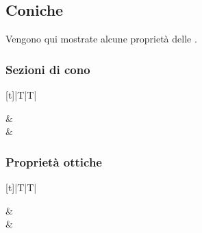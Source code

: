 \documentclass[letterpaper,10pt,italian]{jupyterBook}
\begin{document}
\subsection{Coniche}
\label{\detokenize{ch/analytic_geometry/analytic_geometry_2d/notes:coniche}}\label{\detokenize{ch/analytic_geometry/analytic_geometry_2d/notes:geometry-analytic-2d-notes-conics}}
\sphinxAtStartPar
Vengono qui mostrate alcune proprietà delle {\hyperref[\detokenize{ch/analytic_geometry/analytic_geometry_2d/conics:geometry-analytic-2d-conics}]{}}.


\subsubsection{Sezioni di cono}
\label{\detokenize{ch/analytic_geometry/analytic_geometry_2d/notes:sezioni-di-cono}}\label{\detokenize{ch/analytic_geometry/analytic_geometry_2d/notes:geometry-analytic-2d-notes-conics-cone}}

\begin{savenotes}\sphinxattablestart
\centering
\begin{tabulary}{\linewidth}[t]{|T|T|}
\hline

\sphinxAtStartPar
{}
&
\sphinxAtStartPar
{}
\\
\hline
\sphinxAtStartPar
{}
&
\sphinxAtStartPar
{}
\\
\hline
\end{tabulary}
\par
\sphinxattableend\end{savenotes}


\subsubsection{Proprietà ottiche}
\label{\detokenize{ch/analytic_geometry/analytic_geometry_2d/notes:proprieta-ottiche}}\label{\detokenize{ch/analytic_geometry/analytic_geometry_2d/notes:geometry-analytic-2d-notes-conics-optics}}

\begin{savenotes}\sphinxattablestart
\centering
\begin{tabulary}{\linewidth}[t]{|T|T|}
\hline

\sphinxAtStartPar
{}
&
\sphinxAtStartPar
{}
\\
\hline
\sphinxAtStartPar
{}
&
\sphinxAtStartPar
{}
\\
\hline
\end{tabulary}
\par
\sphinxattableend\end{savenotes}
\end{document}
